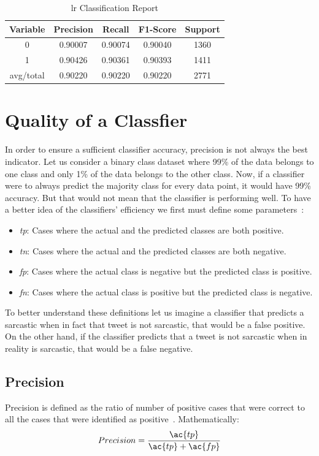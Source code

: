  \begin{table}[h!]
 	\centering
 	\begin{tabular}{||c c c c c||} 
 		\hline
 		Variable & Precision & Recall & F1-Score & Support \\ [0.5ex] 
 		\hline\hline
 		0 & 0.90007 & 0.90074 & 0.90040 & 1360 \\ 
 		1 & 0.90426 & 0.90361 & 0.90393 & 1411 \\
 		avg/total & 0.90220 & 0.90220 & 0.90220 & 2771 \\
 		[1ex] 
 		\hline
 	\end{tabular}
 	\caption{\acl{lr} Classification Report}
 	\label{tab:lr1}
 \end{table}
 
\section{Quality of a Classfier}
\label{sec:score}
In order to ensure a sufficient classifier accuracy, precision is not always the best indicator. Let us consider a binary class dataset where 99\% of the data belongs to one class and only 1\% of the data belongs to the other class. Now, if a classifier were to always predict the majority class for every data point, it would have 99\% accuracy. But that would not mean that the classifier is performing well. To have a better idea of the classifiers' efficiency we first must define some parameters~\cite{f1score}:
\begin{itemize}
	\item \textit{\acf{tp}}: Cases where the actual and the predicted classes are both positive.
	\item \textit{\acf{tn}}: Cases where the actual and the predicted classes are both negative.
	\item \textit{\acf{fp}}: Cases where the actual class is negative but the predicted class is positive.
	\item \textit{\acf{fn}}: Cases where the actual class is positive but the predicted class is negative.
\end{itemize}
To better understand these definitions let us imagine a classifier that predicts a sarcastic when in fact that tweet is not sarcastic, that would be a false positive. On the other hand, if the classifier predicts that a tweet is not sarcastic when in reality is sarcastic, that would be a false negative.
\subsection{Precision}
Precision is defined as the ratio of number of positive cases that were correct to all the cases that were identified as positive~\cite{f1score}. Mathematically:
\begin{equation}
	Precision = \frac{\ac{tp}}{\ac{tp}+\ac{fp}}
	\label{ec:precision}
\end{equation}
